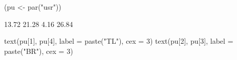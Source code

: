 \begin{Schunk}
\begin{Sinput}
 (pu <- par("usr"))
\end{Sinput}
\begin{Soutput}
[1] 13.72 21.28  4.16 26.84
\end{Soutput}
\begin{Sinput}
 text(pu[1], pu[4], label = paste("TL"), cex = 3)
 text(pu[2], pu[3], label = paste("BR"), cex = 3)
\end{Sinput}
\end{Schunk}
